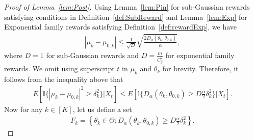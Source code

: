 \documentclass[10pt,a4paper]{amsart}
\def\ind{\mathbb{I}}
\begin{document}
\begin{proof}[Proof of Lemma~\ref{lem:Post}]
    Using Lemma~\ref{lem:Pin} for sub-Gaussian rewards satisfying conditions in Definition~\ref{def:SubReward}   and Lemma~\ref{lem:Exp} for Exponential family rewards satisfying Definition~\ref{def:rewardExp}, we have
    \begin{align}
        \left|   \mu_k-\mu_{0,k}  \right| %
        \leq \frac{1}{\sqrt{D}}\sqrt{\frac{2D_{\alpha}(\theta_k,\theta_{0,k}) }{\alpha}},
        \label{eq:Pins}
        \end{align}
    where $D=1$ for sub-Gaussian rewards and $D=\frac{m}{C_g^2}$ for exponential family rewards. We omit using superscript $t$ in $\mu_k$ and $\theta_k$ for brevity.
    Therefore, it follows from the inequality above that 
    \begin{align}
        E\left[ \ind\{|\mu_k -\mu_{0,k} |^2 \geq \delta_k^2 \} | X_{t} \right] \leq E\left[ \ind\{D_{\alpha}(\theta_k,\theta_{0,k}) \geq D \frac{\alpha}{2} \delta_k^2  \} | X_{t} \right].
        \label{eq:MABDE2}
    \end{align} 
   Now for any $k\in[K]$, let us define a set 
    \begin{align}
        F_k = \left\{\theta_k \in \Theta: D_{\alpha}(\theta_k,\theta_{0,k}) \geq D \frac{\alpha}{2} \delta_k^2  \right\}.
        \label{eq:MABDE2b}
    \end{align}


\end{proof}
\end{document}
